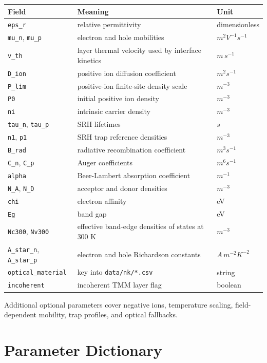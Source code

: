 \documentclass[
  11pt,
  american,
]{report}
\begin{document}
\begin{longtable}[]{@{}lll@{}}
\toprule
Field & Meaning & Unit \\
\midrule
\endhead
\texttt{eps\_r} & relative permittivity & dimensionless \\
\texttt{mu\_n}, \texttt{mu\_p} & electron and hole mobilities &
\(m^2 V^{-1} s^{-1}\) \\
\texttt{v\_th} & layer thermal velocity used by interface kinetics &
\(m\,s^{-1}\) \\
\texttt{D\_ion} & positive ion diffusion coefficient & \(m^2 s^{-1}\) \\
\texttt{P\_lim} & positive-ion finite-site density scale & \(m^{-3}\) \\
\texttt{P0} & initial positive ion density & \(m^{-3}\) \\
\texttt{ni} & intrinsic carrier density & \(m^{-3}\) \\
\texttt{tau\_n}, \texttt{tau\_p} & SRH lifetimes & \(s\) \\
\texttt{n1}, \texttt{p1} & SRH trap reference densities & \(m^{-3}\) \\
\texttt{B\_rad} & radiative recombination coefficient &
\(m^3 s^{-1}\) \\
\texttt{C\_n}, \texttt{C\_p} & Auger coefficients & \(m^6 s^{-1}\) \\
\texttt{alpha} & Beer-Lambert absorption coefficient & \(m^{-1}\) \\
\texttt{N\_A}, \texttt{N\_D} & acceptor and donor densities &
\(m^{-3}\) \\
\texttt{chi} & electron affinity & eV \\
\texttt{Eg} & band gap & eV \\
\texttt{Nc300}, \texttt{Nv300} & effective band-edge densities of states
at 300 K & \(m^{-3}\) \\
\texttt{A\_star\_n}, \texttt{A\_star\_p} & electron and hole Richardson
constants & \(A\,m^{-2}K^{-2}\) \\
\texttt{optical\_material} & key into \texttt{data/nk/*.csv} & string \\
\texttt{incoherent} & incoherent TMM layer flag & boolean \\
\bottomrule
\end{longtable}

Additional optional parameters cover negative ions, temperature scaling,
field-dependent mobility, trap profiles, and optical fallbacks.

\hypertarget{parameter-dictionary}{%
\section{Parameter Dictionary}\label{parameter-dictionary}}
\end{document}
